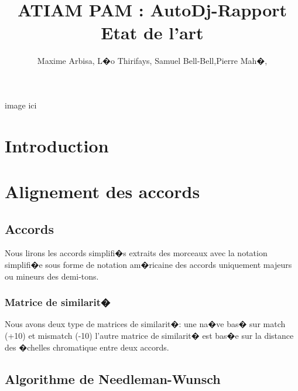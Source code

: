 \documentclass[12pt]{article}
\begin{document}
\title{ATIAM PAM : AutoDj-Rapport\\
Etat de l'art }
\author{Maxime Arbisa, L�o Thirifays, Samuel Bell-Bell,Pierre Mah�,}
\maketitle


\begin{center} image ici
 \end{center}



\newpage
\tableofcontents
\newpage

\section{Introduction}

\section{Alignement des accords}
\subsection{Accords}
Nous lirons les accords simplifi�s extraits des morceaux avec la notation simplifi�e sous forme de notation am�ricaine des accords uniquement majeurs ou mineurs des demi-tons.

\subsubsection{Matrice de similarit�}
Nous avons deux type de matrices de similarit�: 
une na�ve bas� sur match (+10) et mismatch (-10)
l'autre matrice de similarit� est bas�e sur la distance des �chelles chromatique entre deux accords.

\subsection{Algorithme de Needleman-Wunsch}
\end{document}
